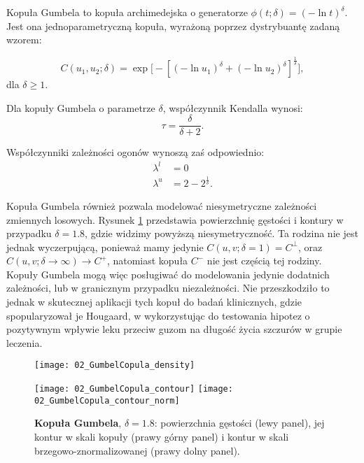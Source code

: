 \begin{df}
	Kopuła Gumbela to kopuła archimedejska o generatorze $\phi(t;\delta) = (-\ln t)^{\delta}$. Jest ona jednoparametryczną kopuła, wyrażoną poprzez dystrybuantę zadaną wzorem:
	
	$$ C(u_1, u_2; \delta) = \exp\big[-[(-\ln u_1)^\delta+(-\ln u_2)^\delta]^{\frac{1}{\delta}}\big],$$
	dla $\delta \geqslant 1.$
\end{df}
\begin{prop}
	Dla kopuły Gumbela o parametrze $\delta$, współczynnik Kendalla wynosi:
	$$ \tau = \frac{\delta}{\delta + 2}.$$
	
	Współczynniki zależności ogonów wynoszą zaś odpowiednio:
	\begin{equation}
		\begin{split}
			\lambda^{l}&=0\\
			\lambda^{u}&=2 - 2^{\frac{1}{\delta}}.
		\end{split}
	\end{equation}
\end{prop}
Kopuła Gumbela również pozwala modelować niesymetryczne zależności zmiennych losowych.  Rysunek \ref{fig:gumbel_copula_density} przedstawia powierzchnię gęstości i kontury w przypadku $\delta = 1.8$, gdzie widzimy powyższą niesymetryczność. Ta rodzina nie jest jednak wyczerpującą, ponieważ mamy jedynie $C(u,v;\delta = 1) = C^{\perp}$, oraz $C(u,v;\delta \to \infty) \to C^{+}$, natomiast kopuła $C^{-}$ nie jest częścią tej rodziny. \\
Kopuły Gumbela mogą więc posługiwać do modelowania jedynie dodatnich zależności, lub w granicznym przypadku niezależności. Nie przeszkodziło to jednak w skutecznej aplikacji tych kopuł do badań klinicznych, gdzie spopularyzował je Hougaard, w \cite{Hougaard1986} wykorzystując do testowania hipotez o pozytywnym wpływie leku przeciw guzom na długość życia szczurów w grupie leczenia.

\begin{figure}[h]
	\centering
	\begin{minipage}{0.5\linewidth}
		\texttt{[image: 02\_GumbelCopula\_density]}
	\end{minipage}
	\begin{minipage}{0.45\linewidth}
		\texttt{[image: 02\_GumbelCopula\_contour]}
		\texttt{[image: 02\_GumbelCopula\_contour\_norm]}
	\end{minipage}
	\caption{\textbf{Kopuła Gumbela}, $\delta = 1.8$: powierzchnia gęstości (lewy panel), jej kontur w skali kopuły (prawy górny panel) i kontur w skali brzegowo-znormalizowanej (prawy dolny panel). \label{fig:gumbel_copula_density}}
\end{figure}

